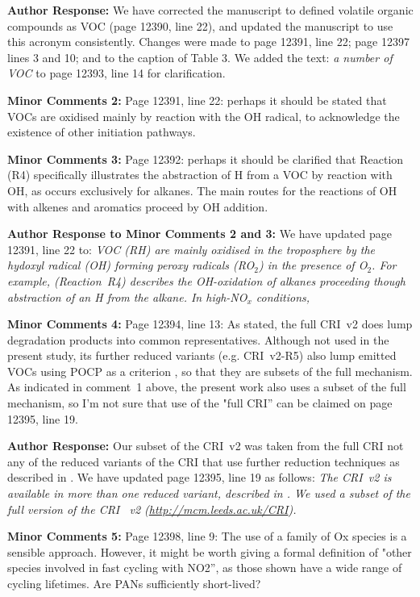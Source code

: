 \documentclass{article}
\begin{document}
\textbf{Author Response:} We have corrected the manuscript to defined volatile organic compounds as VOC (page 12390, line 22), and updated the manuscript to use this acronym consistently. Changes were made to page 12391, line 22; page 12397 lines 3 and 10; and to the caption of Table 3.
We added the text: \textit{a number of VOC} to page 12393, line 14 for clarification.

\textbf{Minor Comments 2:} Page 12391, line 22: perhaps it should be stated that VOCs are oxidised mainly by reaction with the OH radical, to acknowledge the existence of other initiation pathways.

\textbf{Minor Comments 3:} Page 12392: perhaps it should be clarified that Reaction (R4) specifically illustrates the abstraction of H from a VOC by reaction with OH, as occurs exclusively for alkanes. The main routes for the reactions of OH with alkenes and aromatics proceed by OH addition.

\textbf{Author Response to Minor Comments 2 and 3:} We have updated page 12391, line 22 to: \textit{VOC (RH) are mainly oxidised in the troposphere by the hydoxyl radical (OH) forming peroxy radicals (RO$_2$) in the presence of O$_2$. For example, (Reaction~R4) describes the OH-oxidation of alkanes proceeding though abstraction of an H from the alkane. In high-NO$_{x}$ conditions,}

\textbf{Minor Comments 4:} Page 12394, line 13: As stated, the full CRI~v2 does lump degradation products into common representatives. Although not used in the present study, its further reduced variants (e.g. CRI~v2-R5) also lump emitted VOCs using POCP as a criterion \citep{Watson:2008}, so that they are subsets of the full mechanism. As indicated in comment~1 above, the present work also uses a subset of the full mechanism, so I’m not sure that use of the "full CRI'' can be claimed on page 12395, line 19.

\textbf{Author Response:} Our subset of the CRI~v2 was taken from the full CRI not any of the reduced variants of the CRI that use further reduction techniques as described in \citet{Watson:2008}.
We have updated page 12395, line 19 as follows: \textit{The CRI~v2 is available in more than one reduced variant, described in \citet{Watson:2008}. We used a subset of the full version of the CRI~ v2 (\url{http://mcm.leeds.ac.uk/CRI}).}

\textbf{Minor Comments 5:} Page 12398, line 9: The use of a family of Ox species is a sensible approach. However, it might be worth giving a formal definition of "other species involved in fast cycling with NO2'', as those shown have a wide range of cycling lifetimes. Are PANs sufficiently short-lived?
\end{document}
